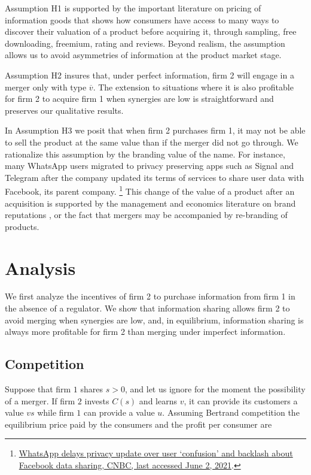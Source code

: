 \documentclass[a4paper,leqno]{article}%
\newcommand{\ov}{\overline{v}}
\begin{document}
Assumption H1 is supported by the important literature on pricing of information goods \citep{shapiro1998information} that shows how consumers have access to many ways to discover their valuation of a product before acquiring it, through sampling, free downloading, freemium, rating and reviews. Beyond realism, the assumption allows us to avoid asymmetries of information at the product market stage.

Assumption H2 insures that, under perfect information, firm 2 will engage in a merger only with type $\ov$. The extension to situations where it is also profitable for firm 2 to acquire firm 1 when synergies are low is straightforward and preserves our qualitative results.

In Assumption H3 we posit that when firm 2 purchases firm 1, it may not be able to sell the product at the same value than if the merger did not go through. We rationalize this assumption by the branding value of the name. For instance, many WhatsApp users migrated to privacy preserving apps such as Signal and Telegram after the company updated its terms of services to share user data with Facebook, its parent company. \footnote{\href{https://www.cnbc.com/2021/01/18/whatsapp-delays-privacy-update-amid-facebook-data-sharing-confusion.html}{WhatsApp delays privacy update over user ‘confusion’ and backlash about Facebook data sharing, CNBC, last accessed June 2, 2021}.} This change of the value of a product after an acquisition is supported by the management and economics literature on brand reputations \citep{fombrun1990,tadelis1999s}, or the fact that mergers may be accompanied by re-branding of products.

\section{Analysis}\label{analysis}

We first analyze the incentives of firm 2 to purchase information from firm 1 in the absence of a regulator. We show that information sharing allows firm 2 to avoid merging when synergies are low, and, in equilibrium, information sharing is always more profitable for firm 2 than merging under imperfect information.

\subsection{Competition}


Suppose that firm $1$ shares $s>0$, and let us ignore for the moment the possibility of a merger. If firm $2$ invests $C(s)$ and learns $v$, it can provide its customers a value $vs$ while firm $1$ can provide a value $u$. Assuming Bertrand competition the equilibrium price paid by the consumers and the profit per consumer are
\end{document}
